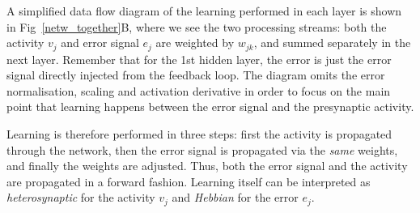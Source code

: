 \documentclass[Afour,sageh,times]{sagej}
\begin{document}
A simplified data flow diagram of the learning performed in each layer
is shown in Fig~\ref{netw_together}B, where we see the two processing
streams: both the activity $v_j$ and error signal $e_j$ are weighted
by $w_{jk}$, and summed separately in the next layer. Remember that
for the 1st hidden layer, the error is just the error signal
directly injected from the feedback loop. The diagram omits the error
normalisation, scaling and activation derivative in order to focus on
the main point that learning happens between the error signal and the
presynaptic activity.

Learning is therefore performed in three steps: first the activity is
propagated through the network, then the error signal is propagated
via the \textsl{same} weights, and finally the weights are adjusted. Thus,
both the error signal and the activity are propagated in a forward
fashion. Learning itself can be interpreted as \textsl{heterosynaptic} for the
activity $v_j$ and \textsl{Hebbian} for the error $e_j$.
\end{document}
